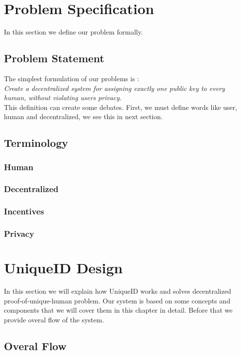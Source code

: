 \documentclass{article}
\begin{document}
\section{ Problem Specification}
In this section we define our problem formally.

\subsection{Problem Statement}
The simplest formulation of our problems is : \\
\textit{Create a decentralized system for assigning exactly one public key to every human, without violating users privacy. }
\\
This definition can create some debates. First, we must define words like user, human and decentralized, we see this in next section. 

\subsection{Terminology}
\subsubsection{Human}
\subsubsection{Decentralized}
\subsubsection{Incentives}
\subsubsection{Privacy}



\section{ UniqueID Design}
In this section we will explain how UniqueID works and solves decentralized proof-of-unique-human problem. Our system is based on some concepts and components that we will cover them in this chapter in detail. Before that we provide overal flow of the system.

\subsection{Overal Flow}
\end{document}
